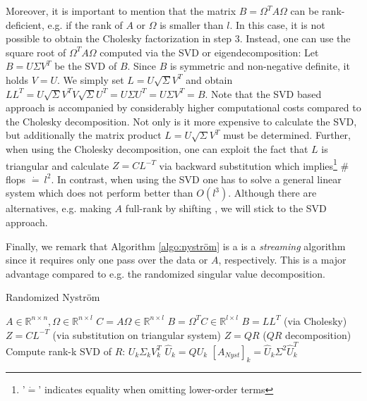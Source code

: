 \documentclass{article}
\theoremstyle{definition}
\begin{document}
 Moreover, it is important to mention that the matrix $B = \Omega^T A \Omega$ can be rank-deficient, e.g. if the rank of $A$ or $\Omega$ is smaller than $l$. In this case, it is not possible to obtain the Cholesky factorization in step 3. Instead, one can use the square root of $\Omega^T A \Omega$ computed via the SVD or eigendecomposition: Let $B = U \Sigma V^T$ be the SVD of $B$. Since $B$ is symmetric and non-negative definite, it holds $V = U$. We simply set $L = U \sqrt{\Sigma} V^T$ and obtain $LL^T = U \sqrt{\Sigma} V^T V \sqrt{\Sigma} U^T = U \Sigma U^T = U \Sigma V^T = B$. Note that the SVD based approach is accompanied by considerably higher computational costs compared to the Cholesky decomposition. Not only is it more expensive to calculate the SVD, but additionally the matrix product $L = U \sqrt{\Sigma} V^T$ must be determined. Further, when using the Cholesky decomposition, one can exploit the fact that $L$ is triangular and calculate $Z = C L^{-T}$ via backward substitution which implies\footnote{'$\dot{=}$' indicates equality when omitting lower-order terms} \# flops $\dot{=}\ l^2$. In contrast, when using the SVD one has to solve a general linear system which does not perform better than $O(l^3)$. Although there are alternatives, e.g. making $A$ full-rank by shifting \cite{tropp2017fixedrank}, we will stick to the SVD approach.
 
 Finally, we remark that Algorithm \ref{algo:nyström} is a is a \textit{streaming} algorithm since it requires only one pass over the data or $A$, respectively. This is a major advantage compared to e.g. the randomized singular value decomposition.
\begin{algorithm}[t]
    \caption{Randomized Nyström} \label{algo:nyström}
    \begin{algorithmic}[1]
        \Require $A \in \mathbb{R}^{n \times n}, \Omega \in \mathbb{R}^{n \times l}$
        \State $C = A \Omega \in \mathbb{R}^{n \times l}$
        \State $B = \Omega^T C \in \mathbb{R}^{l \times l}$
        \State $B = LL^T$ (via Cholesky)
        \State $Z = C L^{-T}$ (via substitution on triangular system)
        \State $Z = QR$ ($QR$ decomposition)
        \State Compute rank-k SVD of $R$: $U_k \Sigma_k V_k^T$
        \State $\hat{U}_k = Q U_k$
        \Ensure $[A_{Nyst}]_k = \hat{U}_k \Sigma^2 \hat{U}_k^T$
    \end{algorithmic}
\end{algorithm}
\end{document}
